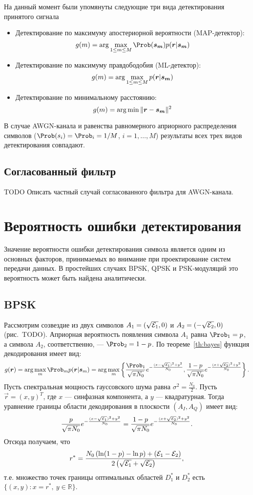 \documentclass{book}
\numberwithin{theorem}{chapter}
\numberwithin{statement}{chapter}
\numberwithin{lemma}{chapter}
\theoremstyle{definition}
\numberwithin{task}{chapter}
\theoremstyle{remark}
\numberwithin{example}{chapter}
\theoremstyle{definition}
\numberwithin{definition}{chapter}
\theoremstyle{remark}
\theoremstyle{remark}
\numberwithin{lyrics}{section}
\begin{document}
На данный момент были упомянуты следующие три вида детектирования принятого сигнала
\begin{itemize}
	\item Детектирование по максимуму апостериорной вероятности (MAP-детектор):
	$$\decisionf{m} = \arg\max\limits_{1 \le m \le M}{\Prob(\bm{s_m})p(\bm{r}|\bm{s_m})}$$
	\item Детектирование по максимуму правдободобия (ML-детектор):
	$$g(m) = \arg\max\limits_{1 \le m \le M}{p(\bm{r}|\bm{s_m})}$$
	\item Детектирование по минимальному расстоянию:
	$$g(m) = \arg\min \|\bm{r} - \bm{s_m}\|^2$$
\end{itemize}
В случае AWGN-канала и равенства равномерного априорного распределения символов ($\Prob(s_i) = \Prob_i =  1 / M$, $i = 1, \dots, M$) результаты всех трех видов детектирования совпадают.

\subsection{Согласованный фильтр}
TODO Описать частный случай согласованного фильтра для AWGN-канала.

\section{Вероятность ошибки детектирования}
Значение вероятности ошибки детектирования символа является одним из основных факторов, принимаемых во внимание при проектирование систем передачи данных. В простейших случаях BPSK, QPSK и PSK-модуляций это вероятность может быть найдена аналитически. 

\subsection{BPSK}
Рассмотрим созвездие из двух символов $A_1 = (\sqrt{\mathcal{E}_1}, 0)$ и $A_2 = (-\sqrt{\mathcal{E}_2}, 0)$ (рис.~TODO). Априорная вероятность появления символа $A_1$ равна $\Prob_1 = p$, а символа $A_2$, соответственно, --- $\Prob_2 = 1 - p$. По теореме~\ref{th:bayes} функция декодирования имеет вид:
$$
\decisionf{\vec{r}} = \argmax\limits_{m} \Prob_m p(\vec{r}|\vec{s}_m) = \argmax_m \left\{ \frac{\Prob_1}{\sqrt{\pi N_0}} e^{-\frac{(x - \sqrt{\Energy_1})^2 + y^2}{N_0}}, \frac{1 - p}{\sqrt{\pi N_0}} e^{-\frac{(x + \sqrt{\Energy_2})^2 + y^2}{N_0}}\right\}.
$$
Пусть спектральная мощность гауссовского шума равна $\sigma^2 = \frac{N_0}{2}$. Пусть $\vec{r} = (x, y)^T$, где $x$ --- синфазная компонента, а $y$ --- квадратурная. Тогда уравнение границы области декодирования в плоскости $(A_I,A_Q)$ имеет вид:
$$
\frac{p}{\sqrt{\pi N_0}} e^{-\frac{(x - \sqrt{\mathcal{E}_1})^2 + y^2}{N_0}} = \frac{1-p}{\sqrt{\pi N_0}} e^{-\frac{(x + \sqrt{\mathcal{E}_2})^2 + y^2}{N_0}}.
$$
Отсюда получаем, что
\begin{gather}
r^* = \frac{N_0\left(\ln (1 - p) - \ln p\right) + (\mathcal{E}_1 - \mathcal{E}_2)}{2\left(\sqrt{\mathcal{E}_1} + \sqrt{\mathcal{E}_2}\right)},
\end{gather}
т.е. множество точек границы оптимальных областей $D_1^*$ и $D_2^*$ есть $\{(x, y)\colon x = r^*,\ y \in \mathbb{R}\}$.
\end{document}
